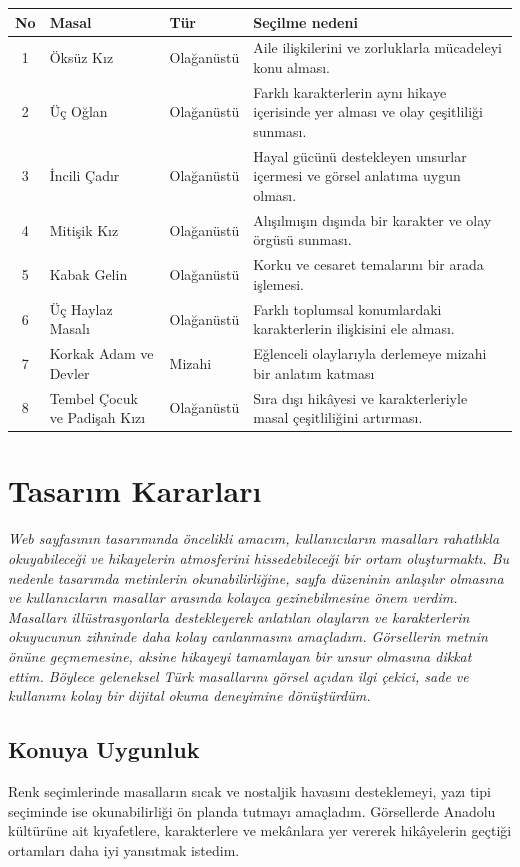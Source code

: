 \documentclass[12pt,a4paper]{article}
\newcommand{\aciklama}[1]{{\color{black}\itshape #1}}
\begin{document}
\begin{longtable}{@{}cp{4cm}p{3cm}p{5.4cm}@{}}
\toprule
\textbf{No} & \textbf{Masal} & \textbf{Tür} & \textbf{Seçilme nedeni} \\
\midrule
\endhead
1 & Öksüz Kız & Olağanüstü & Aile ilişkilerini ve zorluklarla mücadeleyi konu alması. \\
2 & Üç Oğlan & Olağanüstü & Farklı karakterlerin aynı hikaye içerisinde yer alması ve olay çeşitliliği sunması. \\
3 & İncili Çadır & Olağanüstü & Hayal gücünü destekleyen unsurlar içermesi ve görsel anlatıma uygun olması. \\
4 & Mitişik Kız & Olağanüstü & Alışılmışın dışında bir karakter ve olay örgüsü sunması. \\
5 & Kabak Gelin & Olağanüstü & Korku ve cesaret temalarını bir arada işlemesi. \\
6 & Üç Haylaz Masalı & Olağanüstü & Farklı toplumsal konumlardaki karakterlerin ilişkisini ele alması.\\
7 & Korkak Adam ve Devler & Mizahi & Eğlenceli olaylarıyla derlemeye mizahi bir anlatım katması \\
8 & Tembel Çocuk ve Padişah Kızı & Olağanüstü & Sıra dışı hikâyesi ve karakterleriyle masal çeşitliliğini artırması. \\
\bottomrule
\end{longtable}

\section{Tasarım Kararları}
\aciklama{Web sayfasının tasarımında öncelikli amacım, kullanıcıların masalları rahatlıkla okuyabileceği ve hikayelerin atmosferini hissedebileceği bir ortam oluşturmaktı. Bu nedenle tasarımda metinlerin okunabilirliğine, sayfa düzeninin anlaşılır olmasına ve kullanıcıların masallar arasında kolayca gezinebilmesine önem verdim. Masalları illüstrasyonlarla destekleyerek anlatılan olayların ve karakterlerin okuyucunun zihninde daha kolay canlanmasını amaçladım. Görsellerin metnin önüne geçmemesine, aksine hikayeyi tamamlayan bir unsur olmasına dikkat ettim. Böylece geleneksel Türk masallarını görsel açıdan ilgi çekici, sade ve kullanımı kolay bir dijital okuma deneyimine dönüştürdüm.}

\subsection{Konuya Uygunluk}
Renk seçimlerinde masalların sıcak ve nostaljik havasını desteklemeyi, yazı tipi seçiminde ise okunabilirliği ön planda tutmayı amaçladım. Görsellerde Anadolu kültürüne ait kıyafetlere, karakterlere ve mekânlara yer vererek hikâyelerin geçtiği ortamları daha iyi yansıtmak istedim.
\end{document}
